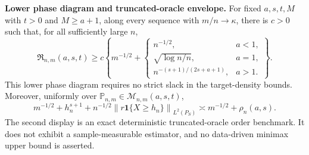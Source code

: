 \textbf{Lower phase diagram and truncated-oracle envelope.} For fixed \(a,s,t,M\) with \(t>0\) and \(M\ge a+1\), along every sequence with \(m/n\to\kappa\), there is \(c>0\) such that, for all sufficiently large \(n\),
\[
\mathfrak R_{n,m}(a,s,t)\ge c\left\{m^{-1/2}+\begin{cases}
n^{-1/2},&a<1,\\
\sqrt{\log n/n},&a=1,\\
n^{-(s+1)/(2s+a+1)},&a>1.
\end{cases}\right\}.
\]
This lower phase diagram requires no strict slack in the target-density bounds. Moreover, uniformly over \(\mathbb P_{n,m}\in\mathcal M_{n,m}(a,s,t)\),
\[
m^{-1/2}+h_n^{s+1}+n^{-1/2}\left\|r\mathbf 1\{X\ge h_n\}\right\|_{L^2(P_S)}
\asymp m^{-1/2}+\rho_n(a,s).
\]
The second display is an exact deterministic truncated-oracle order benchmark. It does not exhibit a sample-measurable estimator, and no data-driven minimax upper bound is asserted.